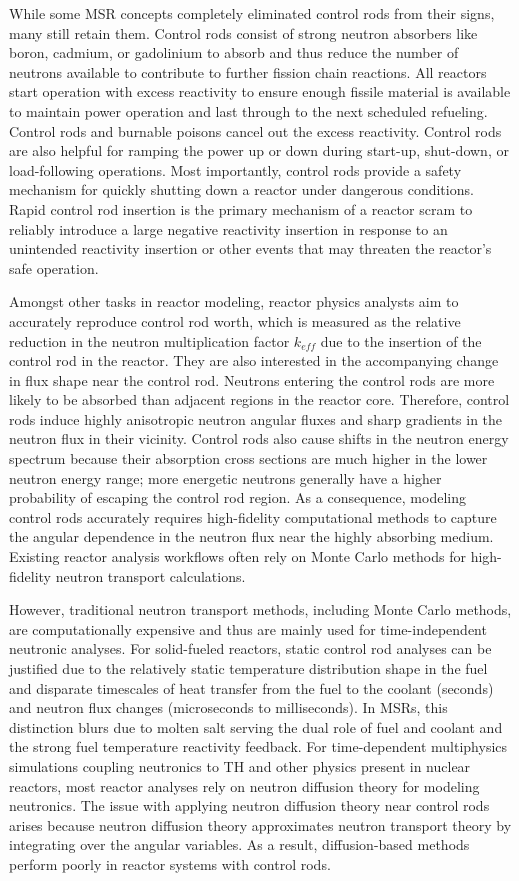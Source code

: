 While some \gls{MSR} concepts completely eliminated control rods from their signs, many still
retain them. Control rods consist of strong
neutron absorbers like boron, cadmium, or gadolinium to absorb and thus reduce the number of
neutrons available to contribute to further fission chain reactions. All reactors start operation
with excess reactivity to ensure enough fissile material is available to maintain power operation
and last through to the next scheduled refueling. Control rods and burnable poisons cancel out the
excess reactivity. Control rods are also helpful
for ramping the power up or down during start-up, shut-down, or load-following operations. Most
importantly, control rods provide a safety mechanism for quickly shutting down a reactor under
dangerous conditions. Rapid control rod insertion is the primary mechanism of a reactor scram to
reliably introduce a large negative reactivity insertion in response to an unintended reactivity
insertion or other events that may threaten the reactor's safe operation. 

Amongst other tasks in reactor modeling, reactor physics analysts aim to accurately reproduce
control rod worth, which is measured as the relative reduction
in the neutron multiplication factor $k_{eff}$ due to the insertion of the control rod in the
reactor. They are also interested in the accompanying change in flux shape near the
control rod. Neutrons entering the control rods are more likely to be absorbed than
adjacent regions in the reactor core. Therefore, control rods induce highly anisotropic neutron
angular fluxes and sharp gradients in the neutron flux in their vicinity. Control rods also cause
shifts in the neutron energy spectrum because their absorption cross sections are much higher in
the lower neutron energy range; more energetic neutrons generally have a higher probability of
escaping the control rod region. As a consequence, modeling control rods accurately requires
high-fidelity computational methods to capture the angular dependence in the neutron
flux near the highly absorbing medium. Existing reactor analysis workflows often rely on Monte
Carlo methods for high-fidelity neutron transport calculations.

However, traditional neutron transport methods, including Monte Carlo methods, are computationally expensive
and thus are mainly used for time-independent neutronic analyses. For solid-fueled reactors,
static control rod analyses can be justified due to the relatively static temperature distribution
shape in the fuel and disparate timescales of heat transfer from the fuel to
the coolant (seconds) and neutron flux changes (microseconds to milliseconds). In
\glspl{MSR}, this distinction blurs due to molten salt serving the dual role of fuel and
coolant and the strong fuel temperature reactivity feedback. For time-dependent multiphysics
simulations coupling neutronics to \gls{TH} and other physics present in nuclear reactors, most
reactor analyses rely on neutron diffusion theory for modeling neutronics. The issue with applying
neutron diffusion theory near control rods arises because neutron diffusion theory approximates
neutron transport theory by integrating over the angular variables. As a result, diffusion-based
methods perform poorly in reactor systems with control rods.

